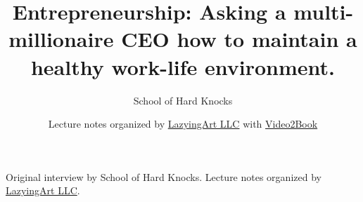 \documentclass[11pt,oneside]{book}
\begin{document}
\frontmatter
\title{Entrepreneurship: Asking a multi-millionaire CEO how to maintain a healthy work-life environment.}
\author{School of Hard Knocks}
\date{Lecture notes organized by \href{https://lazying.art}{LazyingArt LLC} with \href{https://github.com/lachlanchen/Video2Book}{Video2Book}}
\maketitle
\begin{center}
\small Original interview by School of Hard Knocks. Lecture notes organized by \href{https://lazying.art}{LazyingArt LLC}.
\end{center}
\clearpage
\mainmatter

\end{document}
